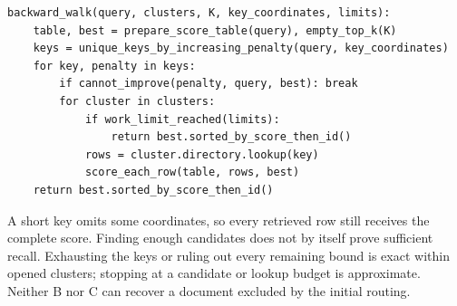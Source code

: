 \begin{lstlisting}
backward_walk(query, clusters, K, key_coordinates, limits):
    table, best = prepare_score_table(query), empty_top_k(K)
    keys = unique_keys_by_increasing_penalty(query, key_coordinates)
    for key, penalty in keys:
        if cannot_improve(penalty, query, best): break
        for cluster in clusters:
            if work_limit_reached(limits):
                return best.sorted_by_score_then_id()
            rows = cluster.directory.lookup(key)
            score_each_row(table, rows, best)
    return best.sorted_by_score_then_id()
\end{lstlisting}

A short key omits some coordinates, so every retrieved row still receives the complete
score. Finding enough candidates does not by itself prove sufficient recall. Exhausting the
keys or ruling out every remaining bound is exact within opened clusters; stopping at a
candidate or lookup budget is approximate. Neither B nor C can recover a document excluded
by the initial routing.
